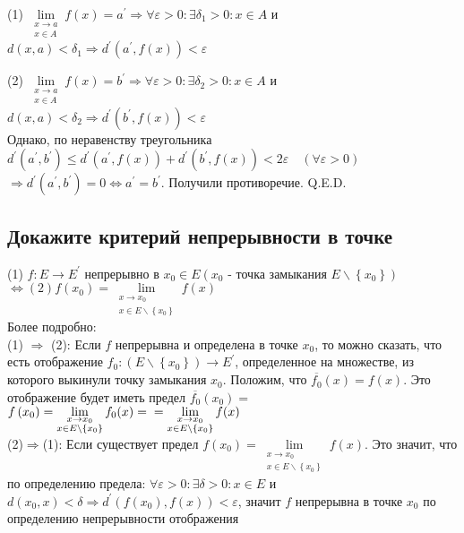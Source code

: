 \documentclass[a4paper]{article}
\begin{document}
(1) $\lim\limits_{\substack{x \rightarrow a \\ x \in A}} f(x)=a^{\prime} \Longrightarrow \forall \varepsilon>0: \exists \delta_{1}>0: x \in A$ и $d(x, a)<\delta_{1} \Longrightarrow d^{\prime}\left(a^{\prime}, f(x)\right)<\varepsilon$

(2) $\lim\limits_{\substack{x \rightarrow a \\ x \in A}} f(x)=b^{\prime} \Longrightarrow \forall \varepsilon>0: \exists \delta_{2}>0: x \in A$ и $d(x, a)<\delta_{2} \Longrightarrow d^{\prime}\left(b^{\prime}, f(x)\right)<\varepsilon$\\
Однако, по неравенству треугольника $d^{\prime}\left(a^{\prime}, b^{\prime}\right) \leqslant d^{\prime}\left(a^{\prime}, f(x)\right)+d^{\prime}\left(b^{\prime}, f(x)\right)<2 \varepsilon \quad(\forall \varepsilon>0)$\\
$\Longrightarrow d^{\prime}\left(a^{\prime}, b^{\prime}\right)=0 \Longleftrightarrow a^{\prime}=b^{\prime}$. Получили противоречие. Q.E.D.

\subsection{Докажите критерий непрерывности в точке}

(1) $f: E \rightarrow E^{\prime}$ непрерывно в $x_{0} \in E\left(x_{0}\right.$ - точка замыкания $\left.E \backslash\left\{x_{0}\right\}\right)$
$\Longleftrightarrow(2) f\left(x_{0}\right)=\lim\limits_{\substack{x \rightarrow x_{0} \\ x \in E \backslash\left\{x_{0}\right\}}} f(x)
$\\
Более подробно:\\
(1) $\Longrightarrow$ (2): Если $f$ непрерывна и определена в точке $x_{0}$, то можно сказать, что есть отображение $f_{0}:\left(E \backslash\left\{x_{0}\right\}\right) \rightarrow E^{\prime}$, определенное на множестве, из которого выкинули точку замыкания $x_{0}$. Положим, что $\overline{f_{0}}(x)=f(x)$. Это отображение будет иметь предел $\overline{f_{0}}\left(x_{0}\right)=$ $f\left(x_{0}\right)=\lim\limits_{\substack{x \rightarrow x_{0} \\ x \in E \backslash\left\{x_{0}\right\}}} f_{0}(x)=\\
=\lim\limits_{\substack{x \rightarrow x_{0} \\ x \in E \backslash\left\{x_{0}\right\}}} f(x)$\\[2mm]
(2)$\Longrightarrow$(1): Если существует предел $f\left(x_{0}\right)=\lim\limits_{\substack{x \rightarrow x_{0} \\ x \in E \backslash\left\{x_{0}\right\}}} f(x)$. Это значит, что по определению предела: $\forall \varepsilon>0: \exists \delta>0: x \in E$ и $d\left(x_{0}, x\right)<\delta \Longrightarrow d^{\prime}\left(f\left(x_{0}\right), f(x)\right)<\varepsilon$, значит $f$ непрерывна в точке $x_{0}$ по определению непрерывности отображения
\end{document}

